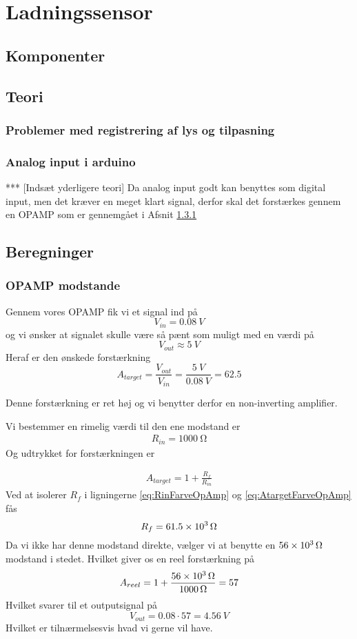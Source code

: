 \section{Ladningssensor}


\subsection{Komponenter}


\subsection{Teori}
\subsubsection{Problemer med registrering af lys og tilpasning}
\subsubsection{Analog input i arduino}
*** [Indsæt yderligere teori]
Da analog input godt kan benyttes som digital input, men det kræver en meget klart signal, derfor skal det forstærkes gennem en OPAMP som er gennemgået i Afsnit \ref{subs:opampanalog}
\subsection{Beregninger}
\subsubsection{OPAMP modstande} \label{subs:opampanalog}
Gennem vores OPAMP fik vi et signal ind på
\[
	V_{in} = \SI{0.08}{V}
\]
og vi ønsker at signalet skulle være så pænt som muligt
med en værdi på
\[
	V_{out} \approx \SI{5}{V}
\]
Heraf er den ønskede forstærkning
\[
	A_{target} = \frac{V_{out}}{V_{in}} = \frac{\SI{5}{V}}{\SI{0.08}{V}}=62.5
\]

Denne forstærkning er ret høj og vi benytter derfor en non-inverting amplifier.

Vi bestemmer en rimelig værdi til den ene modstand er
\begin{align}
	R_{in} = \SI{1000}{\ohm} \label{eq:RinFarveOpAmp}
\end{align}
Og udtrykket for forstærkningen er

\begin{align}
	A_{target} = 1+\frac{R_f}{R_{in}} \label{eq:AtargetFarveOpAmp}
\end{align}
Ved at isolerer $R_f$ i ligningerne \ref{eq:RinFarveOpAmp} og \ref{eq:AtargetFarveOpAmp} fås
\[
	R_f = \SI{61.5d3}{\ohm}
\]
Da vi ikke har denne modstand direkte, vælger vi at benytte en $\SI{56d3}{\ohm}$ modstand i stedet. Hvilket giver os en reel forstærkning på
\[
	A_{reel} = 1 + \frac{\SI{56d3}{\ohm}}{\SI{1000}{\ohm}} = 57	
\]
Hvilket svarer til et outputsignal på
\[
	V_{out} = \SI{0.08}\cdot 57 = \SI{4.56}{V}
\]
Hvilket er tilnærmelsesvis hvad vi gerne vil have.

